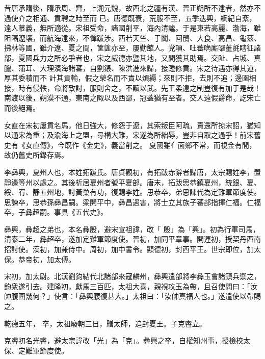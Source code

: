 
\begin{pinyinscope}

 昔唐承隋後，隋承周、齊，上溯元魏，故西北之疆有漢、晉正朔所不逮者，然亦不過使介之相通、貢聘之時至而
 已。唐德既衰，荒服不至，五季迭興，綱紀自紊，遠人慕義，無所適從。宋祖受命，諸國削平，海內清謐。于是東若高麗、渤海，雖阻隔遼壤，而航海遠來，不憚跋涉。西若天竺、于闐、回鶻、大食、高昌、龜茲、拂林等國，雖介遼、夏之間，筐篚亦至，屢勤館人。党項、吐蕃唃廝囉董氈瞎征諸部，夏國兵力之所必爭者也，宋之威德亦暨其地，又間獲其助焉。交阯、占城、真臘、蒲耳、大理濱海諸蕃，自劉鋹、陳洪進來歸，接踵修貢。宋之待遇亦得其道，厚其委積而不
 計其貢輸，假之榮名而不責以煩縟；來則不拒，去則不追；邊圉相接，時有侵軼，命將致討，服則舍之，不黷以武。先王柔遠之制豈復有加于是哉！南渡以後，朔漠不通，東南之陬以及西鄙，冠蓋猶有至者。交人遠假爵命，訖宋亡而後絕焉。



 女直在宋初屢貢名馬，他日強大，修怨于遼，其索叛臣阿疏，責還所掠宋詔，猶知以通宋為重；及渝海上之盟，尋構大難，宋遂為所絀辱，豈非自取之過乎！前宋舊史有《女直傳》，今既作《金史》，義當削之。
 夏國雖亻面鄉不常，而視金有間，故仍舊史所錄存焉。



 李彝興，夏州人也，本姓拓跋氏。唐貞觀初，有拓跋赤辭者歸唐，太宗賜姓李，置靜邊等州以處之。其後析居夏州者號平夏部。唐末，拓跋思恭鎮夏州，統銀、夏、綏、宥、靜五州地，討黃巢有功，復賜李姓。思恭卒，弟思諫代為定難軍節度使。思諫卒，思恭孫彝昌嗣。梁開平中，彝昌遇害，將士立其族子蕃部指揮仁福。仁福卒，子彝超嗣。事具《五代史》。



 彝興，彝超之弟也，本名彝殷，避宋宣祖諱，改「
 殷」為「興」。初為行軍司馬，清泰二年，彝超卒，遂加定難軍節度使。晉初，加同平章事。開運初，授契丹西南招討使。漢初，加兼侍中。周初，加中書令。顯德初，封西平王。世宗即位，加太保。恭帝初，加太傅。



 宋初，加太尉。北漢劉鈞結代北諸部來寇麟州，彝興遣部將李彝玉會諸鎮兵禦之，鈞衆遂引去。建隆初，獻馬三百匹，太祖大喜，親視攻玉為帶，且召使問曰：「汝帥腹圍幾何？」使言：「彝興腰復甚大。」太祖曰：「汝帥真福人也。」遂遣使以帶賜之。



 乾德五年，
 卒，太祖廢朝三日，贈太師，追封夏王。子克睿立。



 克睿初名光睿，避太宗諱改「光」為「克」。彝興之卒，自權知州事，授檢校太保、定難軍節度使。




\end{pinyinscope}
